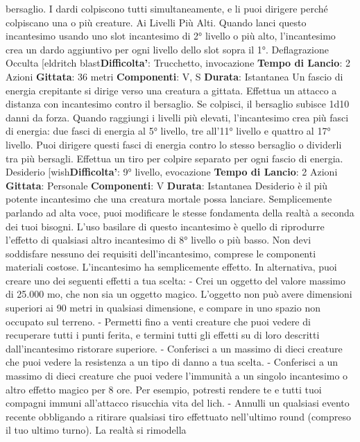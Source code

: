 \begin{multicols}{2}
bersaglio. I dardi colpiscono tutti simultaneamente, e li
puoi dirigere perché colpiscano una o più creature.
Ai Livelli Più Alti. Quando lanci questo incantesimo
usando uno slot incantesimo di 2° livello o più alto,
l’incantesimo crea un dardo aggiuntivo per ogni livello
dello slot sopra il 1°.
Deflagrazione Occulta
[eldritch blast\textbf{Difficolta'}:
Trucchetto, invocazione
\textbf{Tempo di Lancio}: 2 Azioni
\textbf{Gittata}: 36 metri
\textbf{Componenti}: V, S
\textbf{Durata}: Istantanea
Un fascio di energia crepitante si dirige verso una
creatura a gittata. Effettua un attacco a distanza con 
incantesimo contro il bersaglio. Se colpisci, il bersaglio
subisce 1d10 danni da forza.
Quando raggiungi i livelli più elevati, l’incantesimo crea
più fasci di energia: due fasci di energia al 5° livello, tre
all’11° livello e quattro al 17° livello. Puoi dirigere questi
fasci di energia contro lo stesso bersaglio o dividerli tra
più bersagli. Effettua un tiro per colpire separato per
ogni fascio di energia.
Desiderio
[wish\textbf{Difficolta'}:
9° livello, evocazione
\textbf{Tempo di Lancio}: 2 Azioni
\textbf{Gittata}: Personale
\textbf{Componenti}: V
\textbf{Durata}: Istantanea
Desiderio è il più potente incantesimo che una creatura
mortale possa lanciare. Semplicemente parlando ad
alta voce, puoi modificare le stesse fondamenta della
realtà a seconda dei tuoi bisogni.
L’uso basilare di questo incantesimo è quello di
riprodurre l’effetto di qualsiasi altro incantesimo di 8°
livello o più basso. Non devi soddisfare nessuno dei
requisiti dell’incantesimo, comprese le componenti
materiali costose. L’incantesimo ha semplicemente
effetto.
In alternativa, puoi creare uno dei seguenti effetti a tua
scelta:
- Crei un oggetto del valore massimo di 25.000 mo,
che non sia un oggetto magico. L’oggetto non può
avere dimensioni superiori ai 90 metri in qualsiasi
dimensione, e compare in uno spazio non occupato
sul terreno.
- Permetti fino a venti creature che puoi vedere di
recuperare tutti i punti ferita, e termini tutti gli effetti
su di loro descritti dall’incantesimo ristorare
superiore.
- Conferisci a un massimo di dieci creature che puoi
vedere la resistenza a un tipo di danno a tua scelta.
- Conferisci a un massimo di dieci creature che puoi
vedere l’immunità a un singolo incantesimo o altro
effetto magico per 8 ore. Per esempio, potresti
rendere te e tutti tuoi compagni immuni all’attacco
risucchia vita del lich.
- Annulli un qualsiasi evento recente obbligando a
ritirare qualsiasi tiro effettuato nell’ultimo round
(compreso il tuo ultimo turno). La realtà si rimodella

\end{multicols}
